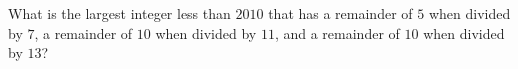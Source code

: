 What is the largest integer less than $2010$ that has a remainder of $5$ when divided by $7$, a remainder of $10$ when divided by $11$, and a remainder of $10$ when divided by $13$?
